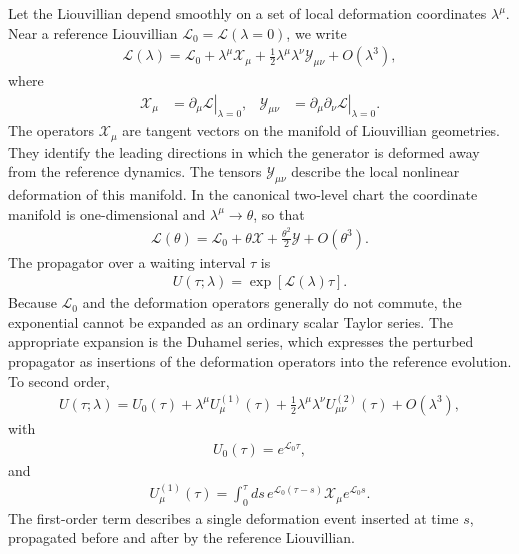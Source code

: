 Let the Liouvillian depend smoothly on a set of local deformation
coordinates \(\lambda^\mu\). Near a reference Liouvillian
\(\mathcal L_0=\mathcal L(\lambda=0)\), we write
\begin{align}
\mathcal L(\lambda)
=
\mathcal L_0
+
\lambda^\mu \mathcal X_\mu
+
\frac12
\lambda^\mu\lambda^\nu
\mathcal Y_{\mu\nu}
+
O(\lambda^3),
\label{eq:L_local_expansion}
\end{align}
where
\begin{align}
\mathcal X_\mu
&=
\left.
\partial_\mu\mathcal L
\right|_{\lambda=0},
&
\mathcal Y_{\mu\nu}
&=
\left.
\partial_\mu\partial_\nu\mathcal L
\right|_{\lambda=0}.
\end{align}
The operators \(\mathcal X_\mu\) are tangent vectors on the
manifold of Liouvillian geometries. They identify the leading
directions in which the generator is deformed away from the
reference dynamics. The tensors \(\mathcal Y_{\mu\nu}\) describe
the local nonlinear deformation of this manifold. In the canonical
two-level chart the coordinate manifold is one-dimensional and
\(\lambda^\mu\rightarrow\theta\), so that
\begin{align}
\mathcal L(\theta)
=
\mathcal L_0
+
\theta\mathcal X
+
\frac{\theta^2}{2}\mathcal Y
+
O(\theta^3).
\label{eq:L_theta_expansion_review}
\end{align}
The propagator over a waiting interval \(\tau\) is
\begin{align}
U(\tau;\lambda)
=
\exp\left[
\mathcal L(\lambda)\tau
\right].
\end{align}
Because \(\mathcal L_0\) and the deformation operators generally
do not commute, the exponential cannot be expanded as an ordinary
scalar Taylor series. The appropriate expansion is the Duhamel
series, which expresses the perturbed propagator as insertions of
the deformation operators into the reference evolution. To second
order,
\begin{align}
U(\tau;\lambda)
=
U_0(\tau)
+
\lambda^\mu U^{(1)}_\mu(\tau)
+
\frac12
\lambda^\mu\lambda^\nu
U^{(2)}_{\mu\nu}(\tau)
+
O(\lambda^3),
\label{eq:U_duhamel_review}
\end{align}
with
\begin{align}
U_0(\tau)
=
e^{\mathcal L_0\tau},
\end{align}
and
\begin{align}
U^{(1)}_\mu(\tau)
=
\int_0^\tau ds\,
e^{\mathcal L_0(\tau-s)}
\mathcal X_\mu
e^{\mathcal L_0 s}.
\label{eq:U1_duhamel_review}
\end{align}
The first-order term describes a single deformation event inserted
at time \(s\), propagated before and after by the reference
Liouvillian.

